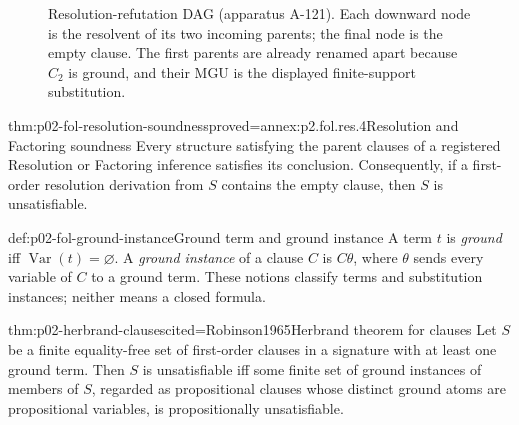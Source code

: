 \begin{figure}[htbp]
\centering
{}
\caption{Resolution-refutation DAG (apparatus A-121).  Each downward node is
the resolvent of its two incoming parents; the final node is the empty clause.
The first parents are already renamed apart because \(C_2\) is ground, and
their MGU is the displayed finite-support substitution.}
\label{fig:p02-fol-resolution-dag}
\end{figure}

\begin{hbtheorem}{thm:p02-fol-resolution-soundness}{proved=annex:p2.fol.res.4}{Resolution and Factoring soundness}
Every structure satisfying the parent clauses of a registered Resolution or
Factoring inference satisfies its conclusion.  Consequently, if a
first-order resolution derivation from \(S\) contains the empty clause, then
\(S\) is unsatisfiable.
\end{hbtheorem}

\begin{hbdefinition}{def:p02-fol-ground-instance}{Ground term and ground instance}
A term \(t\) is \emph{ground} iff
\(\operatorname{Var}(t)=\varnothing\).  A \emph{ground instance} of a
clause \(C\) is \(C\theta\), where \(\theta\) sends
every variable of
\(C\) to a ground term.  These notions classify terms and substitution
instances; neither means a closed formula.
\end{hbdefinition}

\begin{hbtheorem}{thm:p02-herbrand-clauses}{cited=Robinson1965}{Herbrand theorem for clauses}
Let \(S\) be a finite equality-free set of first-order clauses in a signature
with at least one ground term.  Then \(S\) is unsatisfiable iff some finite
set of ground instances of members of \(S\), regarded as propositional
clauses whose distinct ground atoms are propositional variables, is
propositionally unsatisfiable.
\end{hbtheorem}

